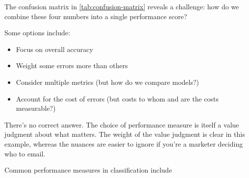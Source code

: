 The confusion matrix in \cref{tab:confusion-matrix} reveals a challenge: how do we combine these four numbers into a single performance score?

Some options include:
\begin{itemize}
\item Focus on overall accuracy
\item Weight some errors more than others
\item Consider multiple metrics (but how do we compare models?)
\item Account for the cost of errors (but costs to whom and are the costs measurable?)
\end{itemize}

There's no correct answer. The choice of performance measure is itself a value judgment about what matters. The weight of the value judgment is clear in this example, whereas the nuances are easier to ignore if you're a marketer deciding who to email.

Common performance measures in classification include

